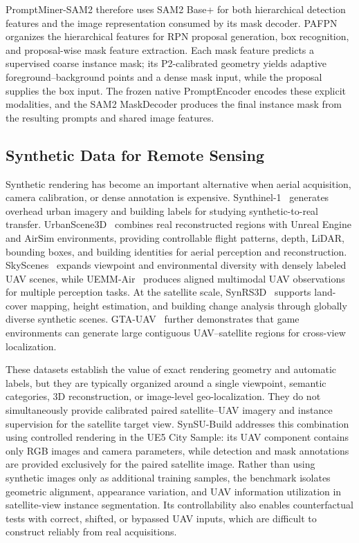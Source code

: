 \documentclass[letterpaper,journal]{IEEEtran}
\begin{document}
PromptMiner-SAM2 therefore uses SAM2 Base+ for both hierarchical detection features and the image representation consumed by its mask decoder. PAFPN organizes the hierarchical features for RPN proposal generation, box recognition, and proposal-wise mask feature extraction. Each mask feature predicts a supervised coarse instance mask; its P2-calibrated geometry yields adaptive foreground--background points and a dense mask input, while the proposal supplies the box input. The frozen native PromptEncoder encodes these explicit modalities, and the SAM2 MaskDecoder produces the final instance mask from the resulting prompts and shared image features.

\subsection{Synthetic Data for Remote Sensing}
Synthetic rendering has become an important alternative when aerial acquisition, camera calibration, or dense annotation is expensive. Synthinel-1~\cite{ref_synthinel} generates overhead urban imagery and building labels for studying synthetic-to-real transfer. UrbanScene3D~\cite{ref_urbanscene3d} combines real reconstructed regions with Unreal Engine and AirSim environments, providing controllable flight patterns, depth, LiDAR, bounding boxes, and building identities for aerial perception and reconstruction. SkyScenes~\cite{ref_skyscenes} expands viewpoint and environmental diversity with densely labeled UAV scenes, while UEMM-Air~\cite{ref_uemmair} produces aligned multimodal UAV observations for multiple perception tasks. At the satellite scale, SynRS3D~\cite{ref_synrs3d} supports land-cover mapping, height estimation, and building change analysis through globally diverse synthetic scenes. GTA-UAV~\cite{ref_gtauav} further demonstrates that game environments can generate large contiguous UAV--satellite regions for cross-view localization.

These datasets establish the value of exact rendering geometry and automatic labels, but they are typically organized around a single viewpoint, semantic categories, 3D reconstruction, or image-level geo-localization. They do not simultaneously provide calibrated paired satellite--UAV imagery and instance supervision for the satellite target view. SynSU-Build addresses this combination using controlled rendering in the UE5 City Sample: its UAV component contains only RGB images and camera parameters, while detection and mask annotations are provided exclusively for the paired satellite image. Rather than using synthetic images only as additional training samples, the benchmark isolates geometric alignment, appearance variation, and UAV information utilization in satellite-view instance segmentation. Its controllability also enables counterfactual tests with correct, shifted, or bypassed UAV inputs, which are difficult to construct reliably from real acquisitions.
\end{document}
